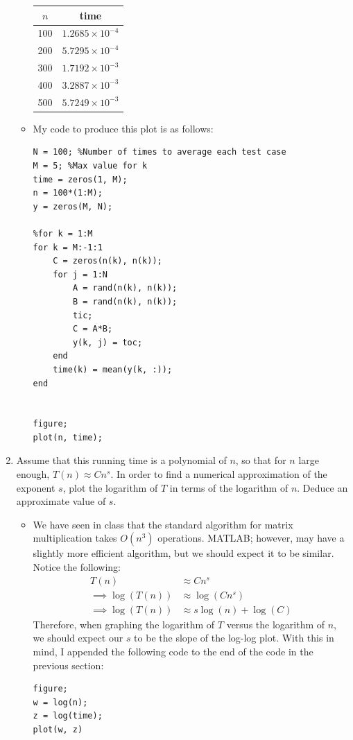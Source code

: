 \documentclass[10pt,a4paper]{article}
\theoremstyle{definition}
\theoremstyle{definition}
\numberwithin{equation}{section}
\begin{document}
\begin{enumerate}[label = (\alph*)]
\begin{itemize}
	\begin{center}
	\begin{tabular}{ |c|c| } 
 	\hline
 	$n$ & time\\ 
 	\hline
 	100 & $1.2685 \times 10^{-4}$\\ 
 	200 & $5.7295 \times 10^{-4}$\\ 
 	300 & $1.7192 \times 10^{-3}$\\
 	400 & $3.2887 \times 10^{-3}$\\
 	500 & $5.7249 \times 10^{-3}$\\
 	\hline
	\end{tabular}
	\end{center}
	\item My code to produce this plot is as follows:
	\\ \begin{verbatim}
N = 100; %Number of times to average each test case
M = 5; %Max value for k
time = zeros(1, M);
n = 100*(1:M);
y = zeros(M, N);

%for k = 1:M
for k = M:-1:1
    C = zeros(n(k), n(k));
    for j = 1:N
        A = rand(n(k), n(k));
        B = rand(n(k), n(k));
        tic;
        C = A*B;
        y(k, j) = toc;
    end
    time(k) = mean(y(k, :));
end


figure;
plot(n, time);
	\end{verbatim}
	\end{itemize}
\item Assume that this running time is a polynomial of $n$, so that for $n$ large enough, $T(n) \approx Cn^s$. In order to find a numerical approximation of the exponent $s$, plot the logarithm of $T$ in terms of the logarithm of $n$. Deduce an approximate value of $s$. 
	\begin{itemize}
	\item We have seen in class that the standard algorithm for matrix multiplication takes $O(n^3)$ operations. MATLAB; however, may have a slightly more efficient algorithm, but we should expect it to be similar. Notice the following:
	\begin{align*}
	T(n) &\approx Cn^s\\
	\implies \log(T(n)) &\approx \log(Cn^s)\\
	\implies \log(T(n)) &\approx s\log(n) + \log(C)
	\end{align*}
	Therefore, when graphing the logarithm of $T$ versus the logarithm of $n$, we should expect our $s$ to be the slope of the log-log plot. With this in mind, I appended the following code to the end of the code in the previous section:
	\begin{verbatim}
figure;
w = log(n);
z = log(time);
plot(w, z)


\end{verbatim}
\end{itemize}
\end{enumerate}
\end{document}
